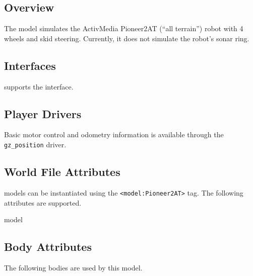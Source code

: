 
\subsection{Overview}

The {\tt \modelName} model simulates the ActivMedia Pioneer2AT (``all
terrain'') robot with 4 wheels and skid steering.  Currently, it does
not simulate the robot's sonar ring.


\subsection{\libgazebo Interfaces}

{\tt \modelName} supports the  interface.


\subsection{Player Drivers}

Basic motor control and odometry information is available through the
{\tt gz\_position} driver.


\subsection{World File Attributes}

{\tt \modelName} models can be instantiated using the
\verb+<model:Pioneer2AT>+ tag.  The following attributes are
supported.

\begin{xmlattrtable}{model}{\modelName}
\modeldefaults
\end{xmlattrtable}


\subsection{Body Attributes}

The following bodies are used by this model.

\begin{bodyattrtable}
\bodydefaults
\end{bodyattrtable}
